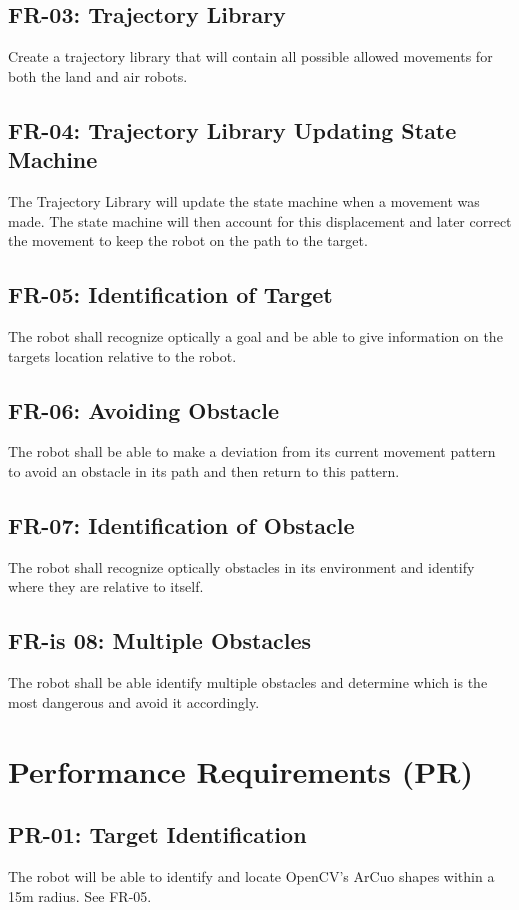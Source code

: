 \documentclass[]{report}
\begin{document}
\subsection{FR-03: Trajectory Library}
Create a trajectory library that will contain all possible allowed movements for both the land and air robots.

\subsection{FR-04: Trajectory Library Updating State Machine}
The Trajectory Library will update the state machine when a movement was made. The state machine will then account for this displacement and later correct the movement to keep the robot on the path to the target. 

\subsection{FR-05: Identification of Target}
The robot shall recognize optically a goal and be able to give information on the targets location relative to the robot. 

\subsection{FR-06: Avoiding Obstacle}
The robot shall be able to make a deviation from its current movement pattern to avoid an obstacle in its path and then return to this pattern.

\subsection{FR-07: Identification of Obstacle}
The robot shall recognize optically obstacles in its environment and identify where they are relative to itself.

\subsection{FR-is 08: Multiple Obstacles}
The robot shall be able identify multiple obstacles and determine which is the most dangerous and avoid it accordingly. 


\section{Performance Requirements (PR)}

\subsection{PR-01: Target Identification}
The robot will be able to identify and locate OpenCV's ArCuo shapes within a 15m radius. See FR-05.
\end{document}
